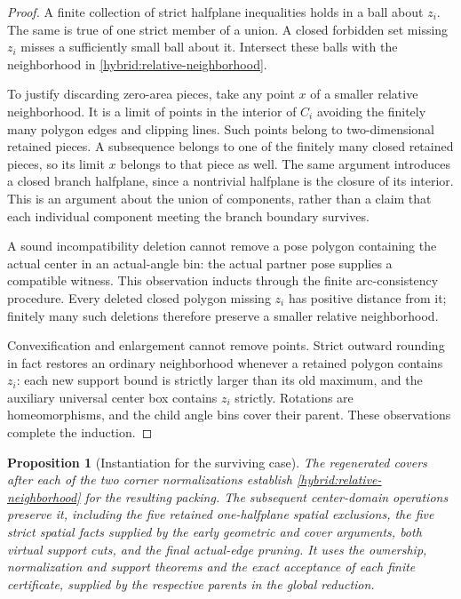 \documentclass[11pt]{article}
\newtheorem{proposition}[theorem]{Proposition}
\begin{document}
\begin{proof}
A finite collection of strict halfplane inequalities holds in a ball
about $z_i$. The same is true of one strict member of a union. A closed
forbidden set missing $z_i$ misses a sufficiently small ball about it.
Intersect these balls with the neighborhood in
\eqref{hybrid:relative-neighborhood}.

To justify discarding zero-area pieces, take any point $x$ of a smaller
relative neighborhood. It is a limit of points in the interior of $C_i$
avoiding the finitely many polygon edges and clipping lines. Such points
belong to two-dimensional retained pieces. A subsequence belongs to one
of the finitely many closed retained pieces, so its limit $x$ belongs to
that piece as well. The same argument introduces a closed branch
halfplane, since a nontrivial halfplane is the closure of its interior.
This is an argument about the union of components, rather than a claim
that each individual component meeting the branch boundary survives.

A sound incompatibility deletion cannot remove a pose polygon containing
the actual center in an actual-angle bin: the actual partner pose supplies
a compatible witness. This observation inducts through the finite
arc-consistency procedure. Every deleted closed polygon missing $z_i$
has positive distance from it; finitely many such deletions therefore
preserve a smaller relative neighborhood.

Convexification and enlargement cannot remove points. Strict outward
rounding in fact restores an ordinary neighborhood whenever a retained
polygon contains $z_i$: each new support bound is strictly larger than
its old maximum, and the auxiliary universal center box contains $z_i$
strictly. Rotations are homeomorphisms, and the child angle bins cover
their parent. These observations complete the induction.
\end{proof}

\begin{proposition}[Instantiation for the surviving case]
\label{hybrid:boundary-instantiation}
The regenerated covers after each of the two corner normalizations
establish \eqref{hybrid:relative-neighborhood} for the resulting packing.
The subsequent center-domain operations preserve it, including the five
retained one-halfplane spatial exclusions, the five strict spatial facts
supplied by the early geometric and cover arguments, both virtual support
cuts, and the final
actual-edge pruning. It uses the ownership, normalization and support
theorems and the exact acceptance of each finite certificate, supplied by
the respective parents in the global reduction.
\end{proposition}
\end{document}
